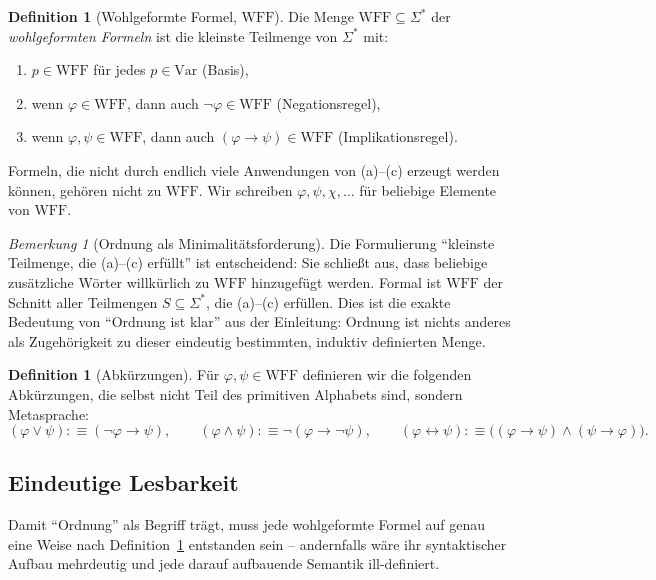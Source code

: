 \documentclass[12pt, a4paper]{article}
\theoremstyle{definition}
\newtheorem{definition}[theorem]{Definition}
\theoremstyle{remark}
\newtheorem{remark}[theorem]{Bemerkung}
\newcommand{\WFF}{\mathrm{WFF}}
\newcommand{\Var}{\mathrm{Var}}
\begin{document}
\begin{definition}[Wohlgeformte Formel, $\WFF$]
\label{def:wff}
Die Menge $\WFF \subseteq \Sigma^\ast$ der \emph{wohlgeformten Formeln} ist die kleinste Teilmenge von $\Sigma^\ast$ mit:
\begin{enumerate}[label=(\alph*)]
  \item $p \in \WFF$ für jedes $p \in \Var$ \hfill (Basis),
  \item wenn $\varphi \in \WFF$, dann auch $\neg\varphi \in \WFF$ \hfill (Negationsregel),
  \item wenn $\varphi, \psi \in \WFF$, dann auch $(\varphi \to \psi) \in \WFF$ \hfill (Implikationsregel).
\end{enumerate}
Formeln, die nicht durch endlich viele Anwendungen von (a)--(c) erzeugt werden können, gehören nicht zu $\WFF$. Wir schreiben $\varphi, \psi, \chi, \dots$ für beliebige Elemente von $\WFF$.
\end{definition}

\begin{remark}[Ordnung als Minimalitätsforderung]
\label{rem:minimalitaet}
Die Formulierung ``kleinste Teilmenge, die (a)--(c) erfüllt'' ist entscheidend: Sie schließt aus, dass beliebige zusätzliche Wörter willkürlich zu $\WFF$ hinzugefügt werden. Formal ist $\WFF$ der Schnitt aller Teilmengen $S \subseteq \Sigma^\ast$, die (a)--(c) erfüllen. Dies ist die exakte Bedeutung von ``Ordnung ist klar'' aus der Einleitung: Ordnung ist nichts anderes als Zugehörigkeit zu dieser eindeutig bestimmten, induktiv definierten Menge.
\end{remark}

\begin{definition}[Abkürzungen]
\label{def:abkuerzungen}
Für $\varphi, \psi \in \WFF$ definieren wir die folgenden Abkürzungen, die selbst nicht Teil des primitiven Alphabets sind, sondern Metasprache:
\[
  (\varphi \lor \psi) :\equiv (\neg\varphi \to \psi), \qquad
  (\varphi \land \psi) :\equiv \neg(\varphi \to \neg\psi), \qquad
  (\varphi \leftrightarrow \psi) :\equiv \big((\varphi \to \psi) \land (\psi \to \varphi)\big).
\]
\end{definition}

\subsection{Eindeutige Lesbarkeit}
\label{subsec:eindeutige_lesbarkeit}

Damit ``Ordnung'' als Begriff trägt, muss jede wohlgeformte Formel auf genau eine Weise nach Definition~\ref{def:wff} entstanden sein -- andernfalls wäre ihr syntaktischer Aufbau mehrdeutig und jede darauf aufbauende Semantik ill-definiert.
\end{document}
